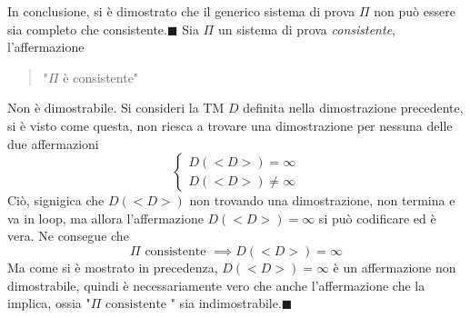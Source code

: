 \documentclass[10pt, letterpaper]{report}
\begin{document}
In conclusione, si è dimostrato che il generico sistema di prova $\Pi$ non può essere sia completo che consistente.\hfill$\blacksquare$\acc 
{} Sia $\Pi$ un sistema di prova \textit{consistente}, l'affermazione \begin{quote}
    "$\Pi$ è consistente"
\end{quote}
Non è dimostrabile. \acc 
\dimo{} Si consideri la TM $D$ definita nella dimostrazione precedente, si è visto come questa, non riesca a trovare una dimostrazione per nessuna delle due affermazioni 
$$ \begin{cases}
    D(<D>)=\infty\\ 
    D(<D>)\ne \infty
\end{cases}$$
Ciò, signigica che $D(<D>)$ non trovando una dimostrazione, non termina e va in loop, ma allora l'affermazione $D(<D>)=\infty$ si può codificare ed è vera. Ne consegue che 
$$ \Pi \text{ consistente }\implies D(<D>)=\infty$$
Ma come si è mostrato in precedenza, $D(<D>)=\infty$ è un affermazione non dimostrabile, quindi è necessariamente vero che anche l'affermazione che la implica, ossia "$\Pi \text{ consistente }$" sia indimostrabile.\hfill$\blacksquare$
\end{document}
